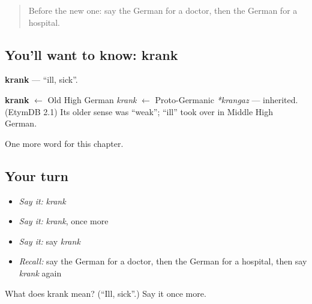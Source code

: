 \label{lesson:GE-C59-krank}



\begin{quote}
Before the new one: say the German for a doctor, then the German for a hospital.
\end{quote}

\subsection*{You'll want to know: krank}
\textbf{krank} — \textquotedblleft{}ill, sick\textquotedblright{}.

\begin{cousinweb}
\textbf{krank} $\leftarrow$ Old High German \emph{krank} $\leftarrow$ Proto-Germanic \emph{*krangaz} — inherited. (EtymDB 2.1) Its older sense was \textquotedblleft{}weak\textquotedblright{}; \textquotedblleft{}ill\textquotedblright{} took over in Middle High German.
\end{cousinweb}

\begin{grammarlens}[title={What you've built}]
One more word for this chapter.
\end{grammarlens}

\subsection*{Your turn}
\begin{itemize}
\raggedright
  \item \emph{Say it:} \emph{krank}
  \item \emph{Say it:} \emph{krank}, once more
  \item \emph{Say it:} say \emph{krank}
  \item \emph{Recall:} say the German for a doctor, then the German for a hospital, then say \emph{krank} again
\end{itemize}

\begin{tcolorbox}[breakable,colback=teal!4,colframe=teal!35!black,title={Before you move on}]
What does krank mean? (\textquotedblleft{}Ill, sick\textquotedblright{}.) Say it once more.
\end{tcolorbox}
